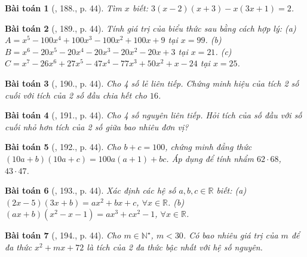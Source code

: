 \documentclass{article}
\newtheorem{baitoan}{Bài toán}
\begin{document}
\begin{baitoan}[\cite{Tuyen_Toan_7}, 188., p. 44]
	Tìm $x$ biết: $3(x - 2)(x + 3) - x(3x + 1) = 2$.
\end{baitoan}

\begin{baitoan}[\cite{Tuyen_Toan_7}, 189., p. 44]
	Tính giá trị của biểu thức sau bằng cách hợp lý: (a) $A = x^5 - 100x^4 + 100x^3 - 100x^2 + 100x + 9$ tại $x = 99$. (b) $B = x^6 - 20x^5 - 20x^4 - 20x^3 - 20x^2 - 20x + 3$ tại $x = 21$. (c) $C = x^7 - 26x^6 + 27x^5 - 47x^4 - 77x^3 + 50x^2 + x - 24$ tại $x = 25$.
\end{baitoan}

\begin{baitoan}[\cite{Tuyen_Toan_7}, 190., p. 44]
	Cho 4 số lẻ liên tiếp. Chứng minh hiệu của tích 2 số cuối với tích của 2 số đầu chia hết cho $16$.
\end{baitoan}

\begin{baitoan}[\cite{Tuyen_Toan_7}, 191., p. 44]
	Cho 4 số nguyên liên tiếp. Hỏi tích của số đầu với số cuối nhỏ hơn tích của 2 số giữa bao nhiêu đơn vị?
\end{baitoan}

\begin{baitoan}[\cite{Tuyen_Toan_7}, 192., p. 44]
	Cho $b + c = 100$, chứng minh đẳng thức $(10a + b)(10a + c) = 100a(a + 1) + bc$. Áp dụng để tính nhẩm $62\cdot68$, $43\cdot47$.
\end{baitoan}

\begin{baitoan}[\cite{Tuyen_Toan_7}, 193., p. 44]
	Xác định các hệ số $a,b,c\in\mathbb{R}$ biết: (a) $(2x - 5)(3x + b) = ax^2 + bx + c$, $\forall x\in\mathbb{R}$. (b) $(ax + b)(x^2 - x - 1) = ax^3 + cx^2 - 1$, $\forall x\in\mathbb{R}$.
\end{baitoan}

\begin{baitoan}[\cite{Tuyen_Toan_7}, 194., p. 44]
	Cho $m\in\mathbb{N}^\star$, $m < 30$. Có bao nhiêu giá trị của $m$ để đa thức $x^2 + mx + 72$ là tích của 2 đa thức bậc nhất với hệ số nguyên.
\end{baitoan}

\end{document}
